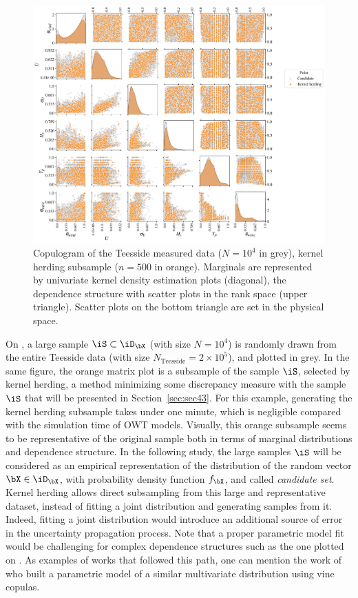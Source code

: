 \begin{figure}[!h]
    \begin{center}
        \includegraphics[width=\linewidth]{part2/figures/DCE/teesside/pairplot_kh.jpg}    
    \end{center}
    \caption{Copulogram of the Teesside measured data ($N=10^4$ in grey), kernel herding subsample ($n=500$ in orange). 
    Marginals are represented by univariate kernel density estimation plots (diagonal), the dependence structure with scatter plots in the rank space (upper triangle). 
    Scatter plots on the bottom triangle are set in the physical space.}
    \label{fig:envi_pairplot}
\end{figure}

On , a large sample $\iS \subset \iD_{\bX}$ (with size $N=10^4$) is randomly drawn from the entire Teesside data (with size $N_{\mathrm{Teesside}} = 2\times 10^5$), and plotted in grey. 
In the same figure, the orange matrix plot is a subsample of the sample $\iS$, selected by kernel herding, a method minimizing some discrepancy measure with the sample $\iS$ that will be presented in Section~\ref{sec:sec43}. 
For this example, generating the kernel herding subsample takes under one minute, which is negligible compared with the simulation time of OWT models. 
Visually, this orange subsample seems to be representative of the original sample both in terms of marginal distributions and dependence structure. 
In the following study, the large samples $\iS$ will be considered as an empirical representation of the distribution of the random vector $\bX \in \iD_{\bX}$, with probability density function $f_{\bX}$, and called \textit{candidate set}. 
Kernel herding allows direct subsampling from this large and representative dataset, instead of fitting a joint distribution and generating samples from it.
Indeed, fitting a joint distribution would introduce an additional source of error in the uncertainty propagation process.
Note that a proper parametric model fit would be challenging for complex dependence structures such as the one plotted on . 
As examples of works that followed this path, one can mention the work of \citet{li_zhan_2020} who built a parametric model of a similar multivariate distribution using vine copulas. 


